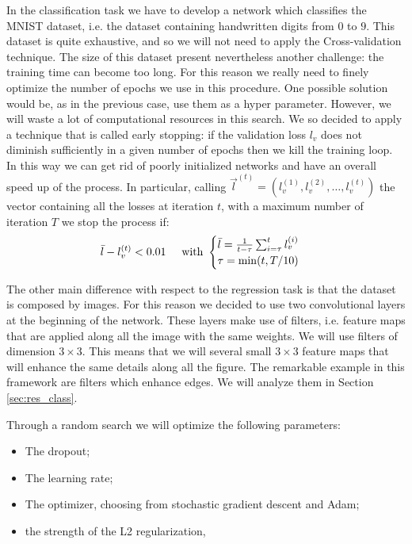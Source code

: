 In the classification task we have to develop a network which classifies the MNIST dataset, i.e. the dataset containing handwritten
digits from $0$ to $9$. This dataset is quite exhaustive, and so we will not need to apply the Cross-validation technique.
The size of this dataset present nevertheless another challenge: the training time can become too long. For this reason we really
need to finely optimize the number of epochs we use in this procedure. One possible solution would be, as in the previous case,
use them as a hyper parameter. However, we will waste a lot of computational resources in this search. We so decided to apply
a technique that is called early stopping: if the validation loss $l_{v}$ does not diminish sufficiently in a given number of
epochs then we kill the training loop. In this way we can get rid of poorly initialized networks and have an overall speed up
of the process. In particular, calling $\vec{l}^{(t)}=(l_{v}^{(1)},l_{v}^{(2)}, \dots, l_{v}^{(t)} )$ the vector containing all the losses at iteration $t$, with a maximum number
of iteration $T$ we stop the process if:
\begin{equation}
    \bar{l} - l_v^{(t)} < 0.01 \hspace{0.5 cm} \mbox{with } \begin{cases}\bar{l}= \frac{1}{t-\tau}\sum_{i=\tau}^t l_v^{(i)} \\ \tau=\min(t, T/10)
    \end{cases}
\end{equation}

The other main difference with respect to the regression task is that the dataset is composed by images. For this reason we 
decided to use two convolutional layers at the beginning of the network. These layers make use of filters, i.e. feature maps
that are applied along all the image with the same weights. We will use filters of dimension $3\times3$. This means that we
will several small $3\times3$ feature maps that will enhance the same details along all the figure. The remarkable example 
in this framework are filters which enhance edges. We will analyze them in Section \ref{sec:res_class}.

Through a random search we will optimize the following parameters:
\begin{itemize}
    \item The dropout;
    \item The learning rate;
    \item The optimizer, choosing from stochastic gradient descent and Adam;
    \item the strength of the L2 regularization,
\end{itemize}

